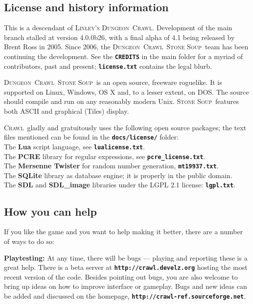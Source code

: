 \documentclass[a4paper,10pt]{article}
\newcommand{\key}[1]{{{\texttt{\textbf{#1}}}}} %
\newcommand{\crawl}{\textsc{Crawl}}
\newcommand{\dungeon}{\textsc{Dungeon}}
\newcommand{\soup}{\textsc{Stone Soup}}
\newcommand{\para}{\vspace{1.5ex}}
\begin{document}
\subsection*{License and history information}

This is a descendant of \textsc{Linley's} \dungeon\ \crawl. 
Development of the main branch stalled at version 4.0.0b26, with a final 
alpha of 4.1 being released by Brent Ross in 2005. Since 2006, the 
\dungeon\ \crawl\ \soup\ team has been continuing the 
development. See the \key{CREDITS} in the main folder for a myriad of 
contributors, past and present; \key{license.txt} contains the legal blurb.

\dungeon\ \crawl\ \soup\ is an open source, freeware roguelike. It is 
supported on Linux, Windows, OS X  and, to a lesser extent, on DOS. The 
source should compile and run on any reasonably modern Unix. \soup\ 
features both ASCII and graphical (Tiles) display.

\crawl\ gladly and gratuitously uses the following open source packages; the
text files mentioned can be found in the \key{docs/license/} folder: \\
The \textbf{Lua} script language, see \key{lualicense.txt}.\\
The \textbf{PCRE} library for regular expressions, see \key{pcre\_license.txt}.\\
The \textbf{Mersenne Twister} for random number generation, \key{mt19937.txt}.\\
The \textbf{SQLite} library as database engine; it is properly in the public domain.\\
The \textbf{SDL} and \textbf{SDL\_image} libraries under the LGPL 2.1 license: 
    \key{lgpl.txt}.


\subsection*{How you can help}

If you like the game and you want to help making it better, there are a number 
of ways to do so:

\para

\textbf{Playtesting:}
At any time, there will be bugs --- playing and reporting these is a great 
help. There is a beta server at \key{http://crawl.develz.org} hosting the most 
recent version of the code. Besides pointing out bugs, you are also welcome to
bring up ideas on how to improve interface or gameplay. Bugs and new ideas can 
be added and discussed on the homepage, \key{http://crawl-ref.sourceforge.net}.
\end{document}
